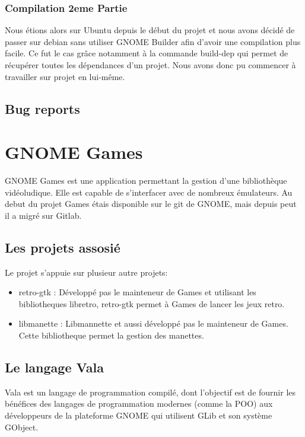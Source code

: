 \documentclass[12pt]{report}
\begin{document}
\subsection{Compilation 2eme Partie}
Nous étions alors sur Ubuntu depuis le début du projet et nous avons
décidé de passer sur debian sans utiliser GNOME Builder afin d'avoir 
une compilation plus facile. Ce fut le cas grâce notamment à la 
commande build-dep qui permet de récupérer toutes les dépendances d'un 
projet. Nous avons donc pu commencer à travailler sur projet en 
lui-même.

\section{Bug reports}

\newpage
\chapter{GNOME Games}
GNOME Games est une application permettant la gestion d'une
bibliothèque vidéoludique. Elle est capable de s'interfacer avec de
nombreux émulateurs.
Au debut du projet Games étais disponible sur le git de GNOME, mais 
depuis peut il a migré sur Gitlab.

\section{Les projets assosié}
Le projet s'appuie sur plusieur autre projets:
\begin{itemize}
\item retro-gtk : Développé pas le mainteneur de Games et utilisant les bibliotheques libretro,
retro-gtk permet à Games de lancer les jeux retro.
\item libmanette : Libmannette et aussi développé pas le mainteneur de Games. Cette bibliotheque
permet la gestion des manettes.
\end{itemize}

\section{Le langage Vala}
Vala est un langage de programmation compilé, dont l'objectif est de
fournir les bénéfices des langages de programmation modernes (comme la
POO) aux développeurs de la plateforme GNOME qui utilisent GLib et son
système GObject.
\end{document}
